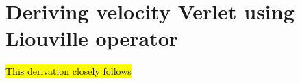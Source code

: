 \section{Deriving velocity Verlet using Liouville operator\label{sec:liou}}
\newcommand{\Liou}{i\hat{\vec L}}
\newcommand{\Lop}{\hat{\mathcal{U}}}
\hl{This derivation closely follows }\cite[section 4.3.3]{frenkel2001understanding}







